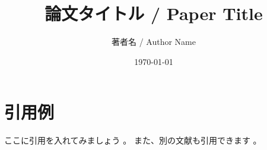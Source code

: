 \documentclass[a4paper,11pt]{article}
\begin{document}
\title{論文タイトル / Paper Title}
\author{著者名 / Author Name}
\date{\today}
\maketitle

\tableofcontents
\clearpage



\section{引用例}
ここに引用を入れてみましょう \cite{example2024}。
また、別の文献も引用できます \cite{examplebook2024}。




\end{document}
